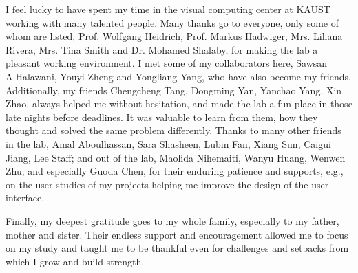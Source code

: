 I feel lucky to have spent my time in the visual computing center at KAUST working with many talented people. Many thanks go to everyone, only some of whom are listed, Prof. Wolfgang Heidrich, Prof. Markus Hadwiger, Mrs. Liliana Rivera, Mrs. Tina Smith and Dr. Mohamed Shalaby, for making the lab a pleasant working environment. I met some of my collaborators here, Sawsan AlHalawani, Youyi Zheng and Yongliang Yang, who have also become my friends. Additionally, my friends Chengcheng Tang, Dongming Yan, Yanchao Yang, Xin Zhao, always helped me without hesitation, and made the lab a fun place in those late nights before deadlines. It was valuable to learn from them, how they thought and solved the same problem differently. Thanks to many other friends in the lab, Amal Aboulhassan, Sara Shasheen, Lubin Fan, Xiang Sun, Caigui Jiang, Lee Staff; and out of the lab, Maolida Nihemaiti, Wanyu Huang, Wenwen Zhu; and especially Guoda Chen, for their enduring patience and supports, e.g., on the user studies of my projects helping me improve the design of the user interface.

Finally, my deepest gratitude goes to my whole family, especially to my father, mother and sister. Their endless support and encouragement allowed me to focus on my study and taught me to be thankful even for challenges and setbacks from which I grow and build strength.








